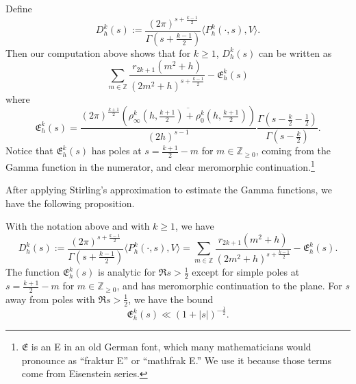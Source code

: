 Define
\begin{equation}\label{eq:hyp:Dh_def}
  D^k_h(s) := \frac{(2\pi)^{s + \frac{k-1}{2}}}{\Gamma(s + \frac{k-1}{2})} \langle
  P_h^k(\cdot, s), V\rangle.
\end{equation}
Then our computation above shows that for $k \geq 1$, $D^k_h(s)$ can be written as
\begin{equation}\label{eq:basic_expansion_final}
  \sum_{m \in \mathbb{Z}}\frac{r_{2k+1}(m^2 + h)}{(2m^2 + h)^{s + \frac{k-1}{2}}} -
  \mathfrak{E}_h^k(s)
\end{equation}
where
\begin{equation}
  \mathfrak{E}_h^k(s) =  \frac{(2\pi)^{\frac{k+1}{2}} (\overline{\rho_\infty^k(h,
  \frac{k+1}{2}) + \rho_0^k(h, \frac{k+1}{2})})}{(2 h)^{s-1}} \frac{\Gamma(s - \frac{k}{2}
- \frac{1}{2})}{\Gamma(s - \frac{k}{2})}.
\end{equation}
Notice that $\mathfrak{E}_h^k(s)$ has poles at $s = \frac{k+1}{2} - m$ for $m \in
\mathbb{Z}_{\geq 0}$, coming from the Gamma function in the
numerator, and clear meromorphic continuation.\footnote{$\mathfrak{E}$ is an E in an old
  German font, which many mathematicians would pronounce as ``fraktur E'' or ``mathfrak
E.'' We use it because those terms come from Eisenstein series.}



After applying Stirling's approximation to estimate the Gamma functions, we have the
following proposition.


\begin{proposition}\label{prop:nonspectral_analytic_props_large_dim}
  With the notation above and with $k \geq 1$, we have
  \begin{equation}
    D^k_h(s) := \frac{(2\pi)^{s + \frac{k-1}{2}}}{\Gamma(s + \frac{k-1}{2})} \langle
    P_h^k(\cdot, s), V\rangle = \sum_{m \in \mathbb{Z}}\frac{r_{2k+1}(m^2 + h)}{(2m^2 +
  h)^{s + \frac{k-1}{2}}} - \mathfrak{E}_h^k(s).
  \end{equation}
  The function $\mathfrak{E}_h^k(s)$ is analytic for $\Re s > \frac{1}{2}$ except for
  simple poles at $s = \frac{k+1}{2} - m$ for $m \in \mathbb{Z}_{\geq 0}$, and has
  meromorphic continuation to the plane.
  For $s$ away from poles with $\Re s > \frac{1}{2}$, we have the bound
  \begin{equation}
    \mathfrak{E}_h^k(s) \ll (1 + \lvert s \rvert)^{-\frac{1}{2}}.
  \end{equation}
\end{proposition}




